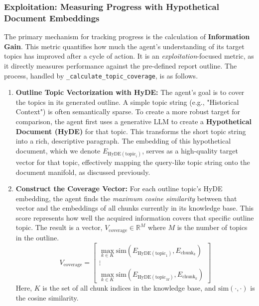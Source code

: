 \documentclass[12pt, a4paper]{article}
\begin{document}
\subsubsection{Exploitation: Measuring Progress with Hypothetical Document Embeddings}

The primary mechanism for tracking progress is the calculation of \textbf{Information Gain}. This metric quantifies how much the agent's understanding of its target topics has improved after a cycle of action. It is an \textit{exploitation}-focused metric, as it directly measures performance against the pre-defined report outline. The process, handled by \verb|_calculate_topic_coverage|, is as follows.

\begin{enumerate}
    \item \textbf{Outline Topic Vectorization with HyDE:} The agent's goal is to cover the topics in its generated outline. A simple topic string (e.g., "Historical Context") is often semantically sparse. To create a more robust target for comparison, the agent first uses a generative LLM to create a \textbf{Hypothetical Document (HyDE)} for that topic. This transforms the short topic string into a rich, descriptive paragraph. The embedding of this hypothetical document, which we denote $E_{\text{HyDE}(\text{topic}_i)}$, serves as a high-quality target vector for that topic, effectively mapping the query-like topic string onto the document manifold, as discussed previously.

    \item \textbf{Construct the Coverage Vector:} For each outline topic's HyDE embedding, the agent finds the \textit{maximum cosine similarity} between that vector and the embeddings of all chunks currently in its knowledge base. This score represents how well the acquired information covers that specific outline topic. The result is a vector, $V_{\mathrm{coverage}} \in \mathbb{R}^M$ where $M$ is the number of topics in the outline.
    \begin{equation}
    V_{\mathrm{coverage}} = \begin{bmatrix}
        \max_{k \in K} \mathrm{sim}(E_{\text{HyDE}(\text{topic}_1)}, E_{\text{chunk}_k}) \\
        \vdots \\
        \max_{k \in K} \mathrm{sim}(E_{\text{HyDE}(\text{topic}_M)}, E_{\text{chunk}_k})
    \end{bmatrix}
    \end{equation}
    Here, $K$ is the set of all chunk indices in the knowledge base, and $\mathrm{sim}(\cdot, \cdot)$ is the cosine similarity.


\end{enumerate}
\end{document}
